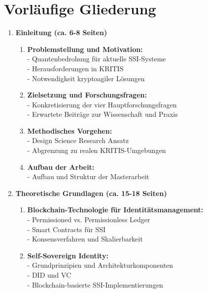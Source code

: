 \newpage
\section{Vorläufige Gliederung} \label{sec:Vorläufige Gliederung}

\begin{enumerate}[label=\textbf{\arabic*.}]
    \item \textbf{Einleitung (ca. 6-8 Seiten)}
    \begin{enumerate}[label=\textbf{1.\arabic*}]
        \item \textbf{Problemstellung und Motivation:} \\
        - Quantenbedrohung für aktuelle \ac{SSI}-Systeme \\
        - Herausforderungen in \ac{KRITIS} \\
        - Notwendigkeit kryptoagiler Lösungen
        \item \textbf{Zielsetzung und Forschungsfragen:} \\
        - Konkretisierung der vier Hauptforschungsfragen \\
        - Erwartete Beiträge zur Wissenschaft und Praxis
        \item \textbf{Methodisches Vorgehen:} \\
        - Design Science Research Ansatz \\
        - Abgrenzung zu realen \ac{KRITIS}-Umgebungen
        \item \textbf{Aufbau der Arbeit:} \\
        - Aufbau und Struktur der Masterarbeit
    \end{enumerate}
    \item \textbf{Theoretische Grundlagen (ca. 15-18 Seiten)}
    \begin{enumerate}[label=\textbf{2.\arabic*}]
        \item \textbf{Blockchain-Technologie für Identitätsmanagement:} \\
        - Permissioned vs. Permissionless Ledger \\
        - Smart Contracts für \ac{SSI} \\
        - Konsensverfahren und Skalierbarkeit
        \item \textbf{Self-Sovereign Identity:} \\
        - Grundprinzipien und Architekturkomponenten \\
        - \ac{DID} und \ac{VC} \\
        - Blockchain-basierte \ac{SSI}-Implementierungen

\end{enumerate}
\end{enumerate}

